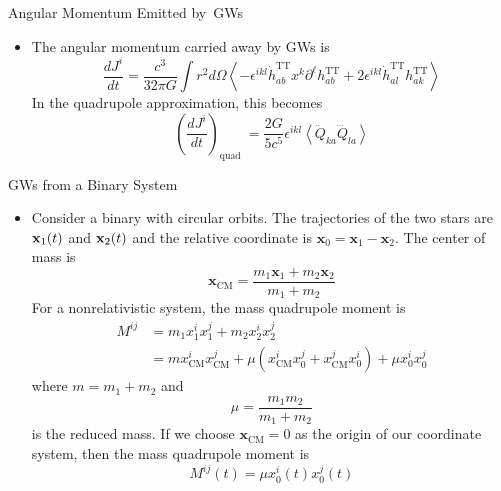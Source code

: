 \documentclass[size=11pt,style=paintings]{powerdot}
\begin{document}
\begin{slide}{Angular Momentum Emitted by\ GWs}
 \begin{itemize}
 \item The angular momentum carried away by GWs is $$
\frac{d J^{i}}{d t}=\frac{c^{3}}{32 \pi G} \int r^{2} d \Omega\left\langle-\epsilon^{i k l} \dot h_{a b}^{\mathrm{TT}} x^{k} \partial^{\ell}  h_{a b}^{\mathrm{TT}}+2 \epsilon^{i k l} \dot h_{a l}^{\mathrm{TT}} h_{a k}^{\mathrm{TT}}\right\rangle
$$
In the quadrupole approximation, this becomes
$$
\left(\frac{d J^{i}}{d t}\right)_{\text {quad }}=\frac{2 G}{5 c^{5}} \epsilon^{i k l}\left\langle\ddot{Q}_{k a} \dddot{Q}_{l a}\right\rangle
$$
 \end{itemize}
 \end{slide}


\begin{slide}{GWs from a Binary System}
 \begin{itemize}
 \item Consider a binary with circular orbits. The trajectories of the two stars are ${\bf x}_1(t)$ and ${\bf x}_2(t)$ and the relative coordinate is $
\mathbf{x}_{0}=\mathbf{x}_{1}-\mathbf{x}_{2}
$. The center of mass is $$
\mathbf{x}_{\mathrm{CM}}=\frac{m_{1} \mathbf{x}_{1}+m_{2} \mathbf{x}_{2}}{m_{1}+m_{2}}
$$
For a nonrelativistic system, the mass quadrupole moment is 
$$
\begin{aligned} M^{i j} &=m_{1} x_{1}^{i} x_{1}^{j}+m_{2} x_{2}^{i} x_{2}^{j} \\ &=m x_{\mathrm{CM}}^{i} x_{\mathrm{CM}}^{j}+\mu\left(x_{\mathrm{CM}}^{i} x_{0}^{j}+x_{\mathrm{CM}}^{j} x_{0}^{i}\right)+\mu x_{0}^{i} x_{0}^{j} \end{aligned}
$$
where $m=m_1+m_2$ and
\vspace{-0.3cm}
$$
\mu = \frac{m_{1} m_{2}}{m_{1}+m_{2}}
$$is the reduced mass. If we choose $\mathbf{x}_\mathrm{CM}=0$ as the origin of our coordinate system, then the mass quadrupole moment is
$$
\boxed{M^{i j}(t)=\mu x_{0}^{i}(t) x_{0}^{j}(t)}
$$
 \end{itemize}
 \end{slide}
\end{document}
